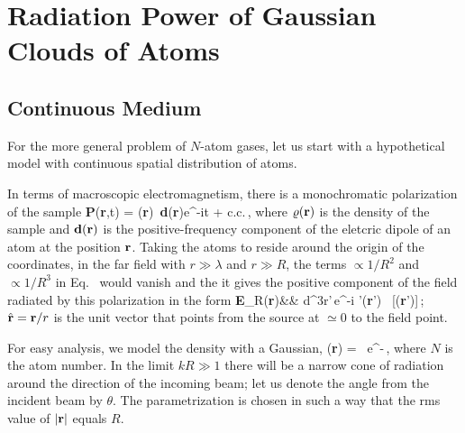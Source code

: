 \section{Radiation Power of Gaussian Clouds of Atoms}


\subsection{Continuous Medium}

For the more general problem of $N$-atom gases, let us start with a hypothetical model with continuous spatial distribution of atoms.

In terms of macroscopic electromagnetism, there is a monochromatic polarization of the sample
\beq
{\bf P}({\bf r},t) = \half\varrho({\bf r}) \,{\bf d}({\bf r})e^{-i\omega t} + {\rm c.c.}\,,
\eeq 
where $\varrho({\bf r})$ is the density of the sample  and $\bf d({\bf r})$ is the positive-frequency component of the eletcric dipole of an atom at the position $\bf r$. Taking the atoms  to reside around the origin of the coordinates, in the far field with $r\gg \lambda$ and $r\gg R$, the terms  $\propto 1/R^2$ and $\propto 1/R^3$ in Eq.~ would vanish and the it gives the positive component of the field radiated by this polarization in the form
\bea
{\bf E}_R({\bf r})&\simeq& \int d^3r'\,e^{-i  '}\varrho({\bf r}')
\, [({\bf r}')]\times{}\,;
\label{SCATFIELD}
\eea
$\hat{\bf r}={\bf r}/r$ is the unit vector that points from the source at $\simeq 0$ to the field point. 

For easy analysis, we model the density with a Gaussian,
\beq
\varrho({\bf r}) = \, e^{-}\,,
\eeq
where $N$ is the atom number. In the limit $kR\gg1$ there will be a narrow cone of radiation around the direction of the incoming beam; let us denote the angle from the incident beam by $\theta$. The parametrization is chosen in such a way that the rms value of $|{\bf r}|$ equals $R$. 


